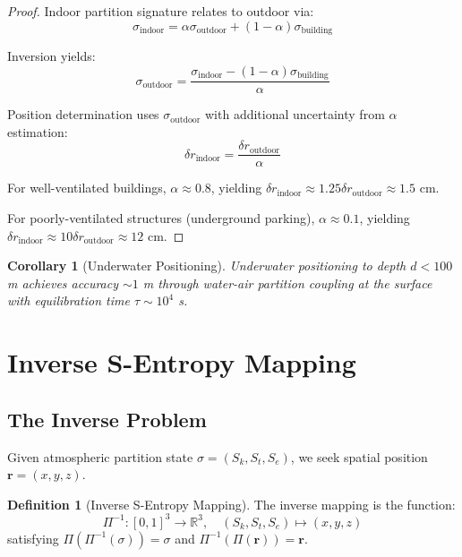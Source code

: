 \documentclass[twocolumn,10pt,a4paper]{article}
\newtheorem{corollary}[theorem]{Corollary}
\theoremstyle{definition}
\newtheorem{definition}[theorem]{Definition}
\theoremstyle{remark}
\begin{document}
\begin{proof}
Indoor partition signature relates to outdoor via:
\begin{equation}
    \sigma_{\text{indoor}} = \alpha \sigma_{\text{outdoor}} + (1-\alpha) \sigma_{\text{building}}
\end{equation}

Inversion yields:
\begin{equation}
    \sigma_{\text{outdoor}} = \frac{\sigma_{\text{indoor}} - (1-\alpha)\sigma_{\text{building}}}{\alpha}
\end{equation}

Position determination uses $\sigma_{\text{outdoor}}$ with additional uncertainty from $\alpha$ estimation:
\begin{equation}
    \delta r_{\text{indoor}} = \frac{\delta r_{\text{outdoor}}}{\alpha}
\end{equation}

For well-ventilated buildings, $\alpha \approx 0.8$, yielding $\delta r_{\text{indoor}} \approx 1.25 \delta r_{\text{outdoor}} \approx 1.5$ cm.

For poorly-ventilated structures (underground parking), $\alpha \approx 0.1$, yielding $\delta r_{\text{indoor}} \approx 10 \delta r_{\text{outdoor}} \approx 12$ cm.
\end{proof}

\begin{corollary}[Underwater Positioning]
\label{cor:underwater}
Underwater positioning to depth $d < 100$ m achieves accuracy $\sim 1$ m through water-air partition coupling at the surface with equilibration time $\tau \sim 10^4$ s.
\end{corollary}

\section{Inverse S-Entropy Mapping}
\label{sec:inverse}

\subsection{The Inverse Problem}

Given atmospheric partition state $\sigma = (S_k, S_t, S_e)$, we seek spatial position $\mathbf{r} = (x, y, z)$.

\begin{definition}[Inverse S-Entropy Mapping]
\label{def:inverse}
The inverse mapping is the function:
\begin{equation}
    \Pi^{-1}: [0,1]^3 \to \mathbb{R}^3, \quad (S_k, S_t, S_e) \mapsto (x, y, z)
\end{equation}
satisfying $\Pi(\Pi^{-1}(\sigma)) = \sigma$ and $\Pi^{-1}(\Pi(\mathbf{r})) = \mathbf{r}$.
\end{definition}
\end{document}
